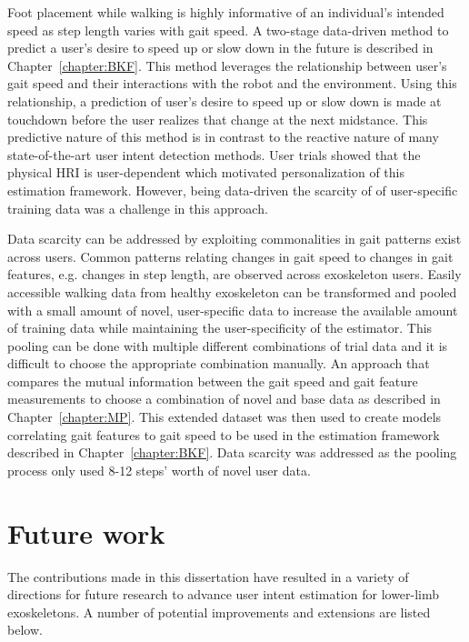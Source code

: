 Foot placement while walking is highly informative of an individual's intended speed as step length varies with gait speed. A two-stage data-driven method to predict a user's desire to speed up or slow down in the future is described in Chapter~\ref{chapter:BKF}. This method leverages the relationship between user's gait speed and their interactions with the robot and the environment. Using this relationship, a prediction of user's desire to speed up or slow down is made at touchdown before the user realizes that change at the next midstance. This predictive nature of this method is in contrast to the reactive nature of many state-of-the-art user intent detection methods. User trials showed that the physical HRI is user-dependent which motivated personalization of this estimation framework. However, being data-driven the scarcity of of user-specific training data was a challenge in this approach. 

Data scarcity can be addressed by exploiting commonalities in gait patterns exist across users. Common patterns relating changes in gait speed to changes in gait features, e.g. changes in step length, are observed across exoskeleton users. Easily accessible walking data from healthy exoskeleton can be transformed and pooled with a small amount of novel, user-specific data to increase the available amount of training data while maintaining the user-specificity of the estimator. This pooling can be done with multiple different combinations of trial data and it is difficult to choose the appropriate combination manually. An approach that compares the mutual information between the gait speed and gait feature measurements to choose a combination of novel and base data as described in Chapter~\ref{chapter:MP}. This extended dataset was then used to create models correlating gait features to gait speed to be used in the estimation framework described in Chapter~\ref{chapter:BKF}. Data scarcity was addressed as the pooling process only used 8-12 steps' worth of novel user data.

\section{Future work}

The contributions made in this dissertation have resulted in a variety of directions for future research to advance user intent estimation for lower-limb exoskeletons. A number of potential improvements and extensions are listed below.

